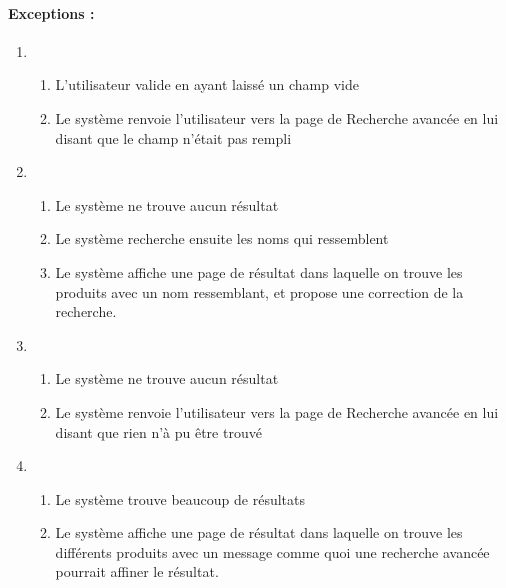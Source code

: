 \begin{boxedminipage}[t]{12cm}
	\paragraph*{Exceptions :}
	\begin{enumerate}
		\item
			\begin{enumerate}
				\item L'utilisateur valide en ayant laissé un champ vide
				\item Le système renvoie l'utilisateur vers la page de Recherche avancée en lui disant que le champ n'était pas rempli
			\end{enumerate}
		\item
			\begin{enumerate}
				\addtocounter{enumii}{1}
				\item Le système ne trouve aucun résultat
				\item Le système recherche ensuite les noms qui ressemblent
				\item Le système affiche une page de résultat dans laquelle on trouve les produits avec un nom ressemblant, et propose une correction de la recherche.
			\end{enumerate} 
		\item
			\begin{enumerate}
				\addtocounter{enumii}{2}
				\item Le système ne trouve aucun résultat
				\item Le système renvoie l'utilisateur vers la page de Recherche avancée en lui disant que rien n'à pu être trouvé
			\end{enumerate}
		\item
			\begin{enumerate}
				\addtocounter{enumii}{1}
				\item Le système trouve beaucoup de résultats
				\item Le système affiche une page de résultat dans laquelle on trouve les différents produits avec un message comme quoi une recherche avancée pourrait affiner le résultat.
			\end{enumerate}	
	\end{enumerate}
\end{boxedminipage}
\newpage
